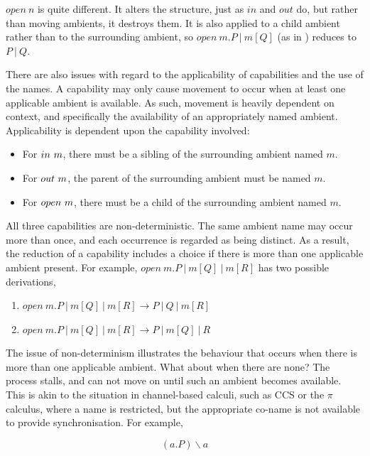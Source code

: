 $open\ n$ is quite different.  It alters the structure, just as $in$ and
$out$ do, but rather than moving ambients, it destroys them.  It is also
applied to a child ambient rather than to the surrounding ambient, so
$open\ m.P\ |\ m[Q]$ (as in \cite{amb}) reduces to $P\ |\ Q$.

There are also issues with regard to the applicability of capabilities
and the use of the names.  A capability may only cause movement to occur
when at least one applicable ambient is available.  As such, movement
is heavily dependent on context, and specifically the availability of an
appropriately named ambient.  Applicability is dependent upon the
capability involved:

\begin{itemize}
\item For $in\ m$, there must be a sibling of the surrounding
ambient named $m$.
\item For $out\ m$, the parent of the surrounding ambient must be
named $m$.
\item For $open\ m$, there must be a child of the surrounding
  ambient named $m$.
\end{itemize}

All three capabilities are non-deterministic.  The same ambient name may
occur more than once, and each occurrence is regarded as being distinct.
As a result, the reduction of a capability includes a choice if there is
more than one applicable ambient present.  For example, $open\ m.P\ |\
m[Q]\ |\ m[R]$ has two possible derivations,

\begin{enumerate}
\item $open\ m.P\ |\ m[Q]\ |\ m[R] \rightarrow P\ |\ Q\ |\ m[R]$
\item $open\ m.P\ |\ m[Q]\ |\ m[R] \rightarrow P\ |\ m[Q]\ |\ R$
\end{enumerate}

The issue of non-determinism illustrates the behaviour that occurs when
there is more than one applicable ambient.  What about when there are
none?  The process stalls, and can not move on until such an ambient
becomes available.  This is akin to the situation in channel-based
calculi, such as CCS or the $\pi$ calculus, where a name is restricted,
but the appropriate co-name is not available to provide synchronisation.
For example,

\begin{equation}
(a.P) \backslash a 
\end{equation}

